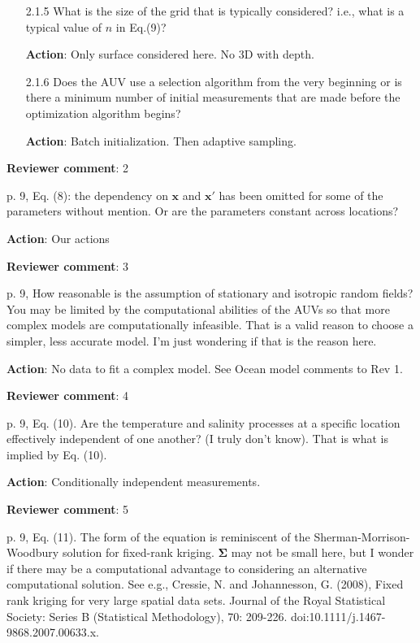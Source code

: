 \documentclass[a4paper]{article}
\newcommand{\bx}{ {\boldsymbol x} }
\newcommand{\bSigma}{ {\boldsymbol \Sigma} }
\def\revcom{\textbf{Reviewer comment}}
\def\action{\textbf{Action}}
\begin{document}
\begin{answers}
\begin{itemize}[noitemsep,topsep=0pt,parsep=0pt,partopsep=0pt]
\item[2.1.5] What is the size of the grid that is typically considered? i.e., what is a typical value of $n$ in Eq.(9)?\par 
\action: Only surface considered here. No 3D with depth. 
\vspace{1em}

\item[2.1.6] Does the AUV use a selection algorithm from the very beginning or is there a minimum number of initial measurements that are made before the optimization algorithm begins?\par
\action: Batch initialization. Then adaptive sampling.
\vspace{1em}

\end{itemize}

\item{\revcom:  2}\label{r2c2}

p. 9, Eq. (8): the dependency on $\bx$ and $\bx'$ has been omitted for some of the parameters without mention. Or are the parameters constant across locations?

\action: Our actions

\item{\revcom:  3}\label{r2c3}

p. 9, How reasonable is the assumption of stationary and isotropic random fields? You may be limited by the computational abilities of the AUVs so that more complex models are computationally infeasible. That is a valid reason to choose a simpler, less accurate model. I’m just wondering if that is the reason here. 

\action: No data to fit a complex model. See Ocean model comments to Rev 1.

\item{\revcom:  4}\label{r2c4}

p. 9, Eq. (10). Are the temperature and salinity processes at a specific location effectively independent of one another? (I truly don’t know). That is what is implied by Eq. (10).

\action: Conditionally independent measurements.

\item{\revcom:  5}\label{r2c5}

p. 9, Eq. (11). The form of the equation is reminiscent of the Sherman-Morrison-Woodbury solution for fixed-rank kriging. $\bSigma$ may not be small here, but I wonder if there may be a computational advantage to considering an alternative computational solution.  See e.g., Cressie, N. and Johannesson, G. (2008), Fixed rank kriging for very large spatial data sets. Journal of the Royal Statistical Society: Series B (Statistical Methodology), 70: 209-226. doi:10.1111/j.1467-9868.2007.00633.x.


\end{answers}
\end{document}
